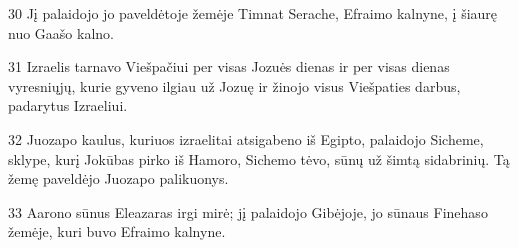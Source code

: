 \par 30 Jį palaidojo jo paveldėtoje žemėje Timnat Serache, Efraimo kalnyne, į šiaurę nuo Gaašo kalno. 
\par 31 Izraelis tarnavo Viešpačiui per visas Jozuės dienas ir per visas dienas vyresniųjų, kurie gyveno ilgiau už Jozuę ir žinojo visus Viešpaties darbus, padarytus Izraeliui. 
\par 32 Juozapo kaulus, kuriuos izraelitai atsigabeno iš Egipto, palaidojo Sicheme, sklype, kurį Jokūbas pirko iš Hamoro, Sichemo tėvo, sūnų už šimtą sidabrinių. Tą žemę paveldėjo Juozapo palikuonys. 
\par 33 Aarono sūnus Eleazaras irgi mirė; jį palaidojo Gibėjoje, jo sūnaus Finehaso žemėje, kuri buvo Efraimo kalnyne.





